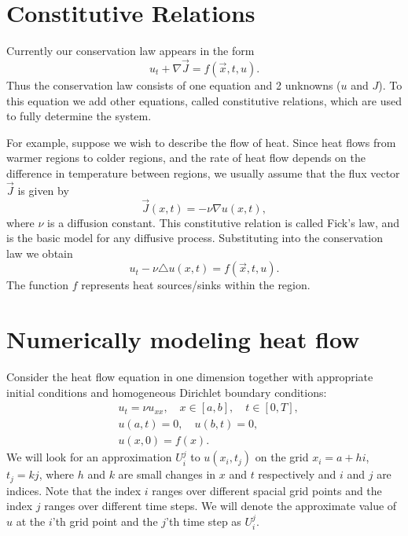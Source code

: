 \section*{Constitutive Relations}
Currently our conservation law appears in the form
\[u_t + \nabla \vec{J} = f(\vec{x},t,u).\]
Thus the conservation law consists of one equation and 2 unknowns ($u$ and $J$).
To this equation we add other equations, called constitutive relations, which are used to fully determine the system.

For example, suppose we wish to describe the flow of heat.
Since heat flows from warmer regions to colder regions, and the rate of heat flow depends on the difference in temperature between regions, we usually assume that the flux vector $\vec{J}$ is given by
\[\vec{J}(x,t) = -\nu \nabla u(x,t),\]
where $\nu$ is a diffusion constant.
This constitutive relation is called Fick's law, and is the basic model for any diffusive process.
Substituting into the conservation law we obtain
\[u_t -\nu \triangle u(x,t) = f(\vec{x},t,u).\]
The function $f$ represents heat sources/sinks within the region.

\section*{Numerically modeling heat flow}
Consider the heat flow equation in one dimension together with appropriate initial conditions and homogeneous Dirichlet boundary conditions:
\begin{align*}
	&{ } u_t = \nu u_{xx}, \quad x \in [a,b],\quad t \in [0,T], \\
	&{ } u(a,t) = 0,\quad u(b,t) = 0,\\
	&{ } u(x,0) = f(x).
\end{align*}
We will look for an approximation $U^j_i$ to $u(x_i,t_j)$ on the grid $x_i = a +  hi$, $t_j = kj$, where $h$ and $k$ are small changes in $x$ and $t$ respectively and $i$ and $j$ are indices.
Note that the index $i$ ranges over different spacial grid points and the index $j$ ranges over different time steps.
We will denote the approximate value of $u$ at the $i$'th grid point and the $j$'th time step as $U_i^j$.

